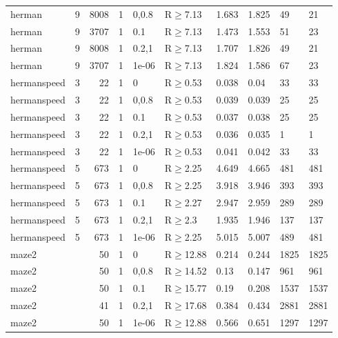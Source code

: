 \begin{longtable}{llrrllllll}
 herman        & 9        &   	8008 & 1 & 0,0.8 & R$\geq$7.13  & 1.683  & 1.825   & 49      & 21   \\
 herman        & 9        &   	3707 & 1 & 0.1   & R$\geq$7.13  & 1.473  & 1.553   & 51      & 23   \\
 herman        & 9        &   	8008 & 1 & 0.2,1 & R$\geq$7.13  & 1.707  & 1.826   & 49      & 21   \\
 herman        & 9        &   	3707 & 1 & 1e-06 & R$\geq$7.13  & 1.824  & 1.586   & 67      & 23   \\
 hermanspeed   & 3        &     	22 & 1 & 0     & R$\geq$0.53  & 0.038  & 0.04    & 33      & 33   \\
 hermanspeed   & 3        &     	22 & 1 & 0,0.8 & R$\geq$0.53  & 0.039  & 0.039   & 25      & 25   \\
 hermanspeed   & 3        &     	22 & 1 & 0.1   & R$\geq$0.53  & 0.037  & 0.038   & 25      & 25   \\
 hermanspeed   & 3        &     	22 & 1 & 0.2,1 & R$\geq$0.53  & 0.036  & 0.035   & 1       & 1    \\
 hermanspeed   & 3        &     	22 & 1 & 1e-06 & R$\geq$0.53  & 0.041  & 0.042   & 33      & 33   \\
 hermanspeed   & 5        &    	673 & 1 & 0     & R$\geq$2.25  & 4.649  & 4.665   & 481     & 481  \\
 hermanspeed   & 5        &    	673 & 1 & 0,0.8 & R$\geq$2.25  & 3.918  & 3.946   & 393     & 393  \\
 hermanspeed   & 5        &    	673 & 1 & 0.1   & R$\geq$2.27  & 2.947  & 2.959   & 289     & 289  \\
 hermanspeed   & 5        &    	673 & 1 & 0.2,1 & R$\geq$2.3   & 1.935  & 1.946   & 137     & 137  \\
 hermanspeed   & 5        &    	673 & 1 & 1e-06 & R$\geq$2.25  & 5.015  & 5.007   & 489     & 481  \\
 maze2         &          &     	50 & 1 & 0     & R$\geq$12.88 & 0.214  & 0.244   & 1825    & 1825 \\
 maze2         &          &     	50 & 1 & 0,0.8 & R$\geq$14.52 & 0.13   & 0.147   & 961     & 961  \\
 maze2         &          &     	50 & 1 & 0.1   & R$\geq$15.77 & 0.19   & 0.208   & 1537    & 1537 \\
 maze2         &          &     	41 & 1 & 0.2,1 & R$\geq$17.68 & 0.384  & 0.434   & 2881    & 2881 \\
 maze2         &          &     	50 & 1 & 1e-06 & R$\geq$12.88 & 0.566  & 0.651   & 1297    & 1297 \\

\end{longtable}
